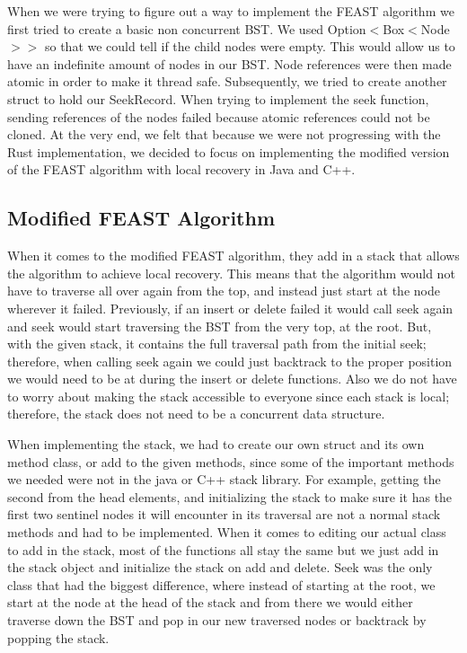 \documentclass[conference]{IEEEtran}
\begin{document}
When we were trying to figure out a way to implement the FEAST algorithm we first tried to create a basic non concurrent BST. We used Option$<$Box$<$Node$>>$ so that we could tell if the child nodes were empty. This would allow us to have an indefinite amount of nodes in our BST. Node references were then made atomic in order to make it thread safe. Subsequently, we tried to create another struct to hold our SeekRecord. When trying to implement the seek function, sending references of the nodes failed because atomic references could not be cloned. At the very end, we felt that because we were not progressing with the Rust implementation, we decided to focus on implementing the modified version of the FEAST algorithm with local recovery in Java and C++.


\subsection{Modified FEAST Algorithm}\label{AA}
When it comes to the modified FEAST algorithm, they add in a stack that allows the algorithm to achieve local recovery. This means that the algorithm would not have to traverse all over again from the top, and instead just start at the node wherever it failed. Previously, if an insert or delete failed it would call seek again and seek would start traversing the BST from the very top, at the root. But, with the given stack, it contains the full traversal path from the initial seek; therefore, when calling seek again we could just backtrack to the proper position we would need to be at during the insert or delete functions. Also we do not have to worry about making the stack accessible to everyone since each stack is local; therefore, the stack does not need to be a concurrent data structure.

When implementing the stack, we had to create our own struct and its own method class, or add to the given methods, since some of the important methods we needed were not in the java or C++ stack library. For example, getting the second from the head elements, and initializing the stack to make sure it has the first two sentinel nodes it will encounter in its traversal are not a normal stack methods and had to be implemented. When it comes to editing our actual class to add in the stack, most of the functions all stay the same but we just add in the stack object and initialize the stack on add and delete. Seek was the only class that had the biggest difference, where instead of starting at the root, we start at the node at the head of the stack and from there we would either traverse down the BST and pop in our new traversed nodes or backtrack by popping the stack.
\end{document}
